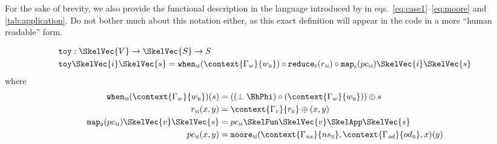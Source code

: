 For the sake of brevity, we also provide the functional description in the language introduced by \cite{ungureanu17} in eqs.~\eqref{eq:case1}--\eqref{eq:moore} and \cref{tab:application}. Do not bother much about this notation either, as this exact definition will appear in the code in a more ``human readable'' form.

\begin{align}
  \mathtt{toy}& : \SkelVec{V} \rightarrow
                \SkelVec{S} \rightarrow S \label{eq:case1}\\
  \mathtt{toy} &\SkelVec{i}\SkelVec{s} =
                 \mathtt{when}_{\textsc{m}}(\context{\Gamma_w}{w_{\textsc{b}}}) \circ
                 \mathtt{reduce}_{\textsc{s}}(r_{\textsc{m}}) \circ
                 \mathtt{map}_{\textsc{s}}(pc_{\textsc{m}})\SkelVec{i}\SkelVec{s}
                 \nonumber
\end{align}%
where%
\begin{align}
  \mathtt{when}_{\textsc{m}} (\context{\Gamma_w}{w_{\textsc{b}}})(s)
  & = ((\bot\ \BhPhi) \circ (\context{\Gamma_w}{w_{\textsc{b}}}))
    \oplus s \label{eq:when}\\
  r_{\textsc{m}}(x,y) &= \context{\Gamma_r}{r_{\textsc{b}}} \oplus (x,y) \\
  \mathtt{map_{s}}(pc_{\textsc{m}})\SkelVec{v}\SkelVec{s}
  &= pc_{\textsc{m}} \SkelFun \SkelVec{v} \SkelApp
    \SkelVec{s} \label{eq:re-map}\\
  pc_{\textsc{m}}(x,y)
  &= \mathtt{moore}_{\textsc{m}} (%
    \context{\Gamma_{\mathit ns}}{ns_{\textsc{b}}},
    \context{\Gamma_{\mathit od}}{od_{\textsc{b}}},x)(y)\label{eq:moore}
\end{align}

